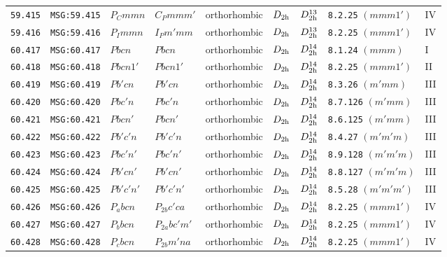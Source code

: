 \documentclass[fleqn,10pt]{jsarticle}
\begin{document}
\begin{center}
\begin{longtable}{lllllllll}
\texttt{59.415} & \texttt{MSG:59.415} & $P_{C}mmn$ & $C_{P}mmm'$ & orthorhombic & $D_{\rm 2h}$ & $D_{\rm 2h}^{13}$ & \texttt{8.2.25} $(mmm1')$ & IV \\
\texttt{59.416} & \texttt{MSG:59.416} & $P_{I}mmn$ & $I_{P}m'mm$ & orthorhombic & $D_{\rm 2h}$ & $D_{\rm 2h}^{13}$ & \texttt{8.2.25} $(mmm1')$ & IV \\ \hline
\texttt{60.417} & \texttt{MSG:60.417} & $Pbcn$ & $Pbcn$ & orthorhombic & $D_{\rm 2h}$ & $D_{\rm 2h}^{14}$ & \texttt{8.1.24} $(mmm)$ & I \\
\texttt{60.418} & \texttt{MSG:60.418} & $Pbcn1'$ & $Pbcn1'$ & orthorhombic & $D_{\rm 2h}$ & $D_{\rm 2h}^{14}$ & \texttt{8.2.25} $(mmm1')$ & II \\
\texttt{60.419} & \texttt{MSG:60.419} & $Pb'cn$ & $Pb'cn$ & orthorhombic & $D_{\rm 2h}$ & $D_{\rm 2h}^{14}$ & \texttt{8.3.26} $(m'mm)$ & III \\
\texttt{60.420} & \texttt{MSG:60.420} & $Pbc'n$ & $Pbc'n$ & orthorhombic & $D_{\rm 2h}$ & $D_{\rm 2h}^{14}$ & \texttt{8.7.126} $(m'mm)$ & III \\
\texttt{60.421} & \texttt{MSG:60.421} & $Pbcn'$ & $Pbcn'$ & orthorhombic & $D_{\rm 2h}$ & $D_{\rm 2h}^{14}$ & \texttt{8.6.125} $(m'mm)$ & III \\
\texttt{60.422} & \texttt{MSG:60.422} & $Pb'c'n$ & $Pb'c'n$ & orthorhombic & $D_{\rm 2h}$ & $D_{\rm 2h}^{14}$ & \texttt{8.4.27} $(m'm'm)$ & III \\
\texttt{60.423} & \texttt{MSG:60.423} & $Pbc'n'$ & $Pbc'n'$ & orthorhombic & $D_{\rm 2h}$ & $D_{\rm 2h}^{14}$ & \texttt{8.9.128} $(m'm'm)$ & III \\
\texttt{60.424} & \texttt{MSG:60.424} & $Pb'cn'$ & $Pb'cn'$ & orthorhombic & $D_{\rm 2h}$ & $D_{\rm 2h}^{14}$ & \texttt{8.8.127} $(m'm'm)$ & III \\
\texttt{60.425} & \texttt{MSG:60.425} & $Pb'c'n'$ & $Pb'c'n'$ & orthorhombic & $D_{\rm 2h}$ & $D_{\rm 2h}^{14}$ & \texttt{8.5.28} $(m'm'm')$ & III \\
\texttt{60.426} & \texttt{MSG:60.426} & $P_{a}bcn$ & $P_{2b}c'ca$ & orthorhombic & $D_{\rm 2h}$ & $D_{\rm 2h}^{14}$ & \texttt{8.2.25} $(mmm1')$ & IV \\
\texttt{60.427} & \texttt{MSG:60.427} & $P_{b}bcn$ & $P_{2a}bc'm'$ & orthorhombic & $D_{\rm 2h}$ & $D_{\rm 2h}^{14}$ & \texttt{8.2.25} $(mmm1')$ & IV \\
\texttt{60.428} & \texttt{MSG:60.428} & $P_{c}bcn$ & $P_{2b}m'na$ & orthorhombic & $D_{\rm 2h}$ & $D_{\rm 2h}^{14}$ & \texttt{8.2.25} $(mmm1')$ & IV \\

\end{longtable}
\end{center}
\end{document}
